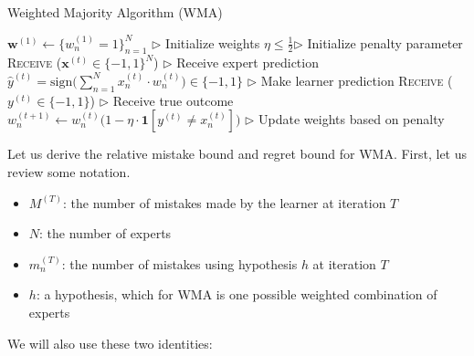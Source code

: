 \documentclass[11pt]{article}
\begin{document}
\begin{algorithm}[H]
\caption{Weighted Majority Algorithm (WMA)}
\label{algo:wma}
\begin{algorithmic}[1]
\STATE $\textbf{w}^{(1)} \leftarrow \{w_n^{(1)}=1\}_{n=1}^N$ \hfill $\triangleright$ Initialize weights
\STATE $\eta\leq\frac{1}{2}$\hfill $\triangleright$ Initialize penalty parameter
\STATE \textsc{Receive} ($\textbf{x}^{(t)}\in\{-1, 1\}^N$) \hfill $\triangleright$ Receive expert prediction
\STATE $\hat{y}^{(t)} = \text{sign}\Big(\sum_{n=1}^Nx_n^{(t)}\cdot w_n^{(t)}\Big)\in\{-1, 1\}$ \hfill $\triangleright$ Make learner prediction
\STATE \textsc{Receive} ($y^{(t)}\in\{-1, 1\}$) \hfill $\triangleright$ Receive true outcome
\STATE $w_n^{(t+1)}\leftarrow w_n^{(t)}\big(1-\eta\cdot\textbf{1}[y^{(t)}\neq x_n^{(t)}]\big)$ \hfill $\triangleright$ Update weights based on penalty \label{alg:wma_weight_update}
\ENDFOR
\end{algorithmic}
\end{algorithm}

Let us derive the relative mistake bound and regret bound for WMA. First, let us review some notation.
\begin{itemize}
    \item $M^{(T)}$: the number of mistakes made by the learner at iteration $T$
    \item $N$: the number of experts
    \item $m_n^{(T)}$: the number of mistakes using hypothesis $h$ at iteration $T$
    \item $h$: a hypothesis, which for WMA is one possible weighted combination of experts
\end{itemize}

We will also use these two identities:
\label{lemma:1}
\end{document}
